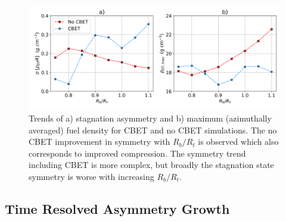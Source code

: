 \begin{figure}[t!]
    \includegraphics[width=1.0\linewidth]{Results1/Images/RbRt_sig_rhomax.png}
    \centering
    \caption{Trends of a) stagnation asymmetry and b) maximum (azimuthally averaged) fuel density for \ac{CBET} and no \ac{CBET} simulations.
    The no \ac{CBET} improvement in symmetry with $R_b/R_t$ is observed which also corresponds to improved compression.
    The symmetry trend including \ac{CBET} is more complex, but broadly the stagnation state symmetry is worse with increasing $R_b/R_t$.}%
    \label{fig:Res1_asymm_trend}
\end{figure}


\subsection{Time Resolved Asymmetry Growth}%
\label{sec:Res1_time_res_growth}

